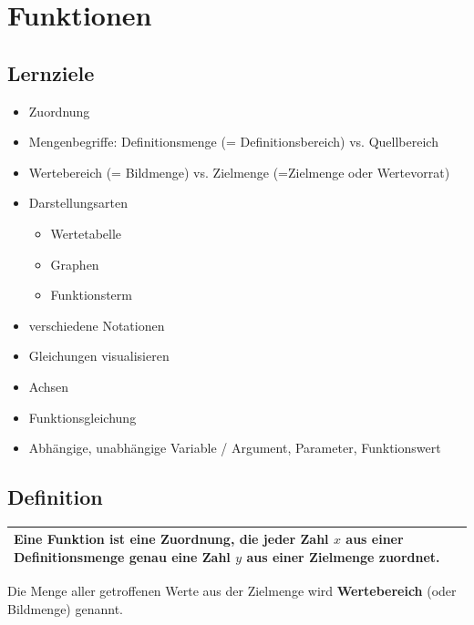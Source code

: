
\section{Funktionen}
\subsection*{Lernziele}

\begin{itemize}
 \item Zuordnung
 \item Mengenbegriffe: Definitionsmenge (= Definitionsbereich) vs. Quellbereich
 \item Wertebereich (= Bildmenge) vs. Zielmenge
   (=Zielmenge oder Wertevorrat)
 \item Darstellungsarten
   \begin{itemize}
      \item Wertetabelle
      \item Graphen
      \item Funktionsterm
   \end{itemize}
 \item verschiedene Notationen
 \item Gleichungen visualisieren
 \item Achsen
 \item Funktionsgleichung
 \item Abhängige, unabhängige Variable / Argument, Parameter, Funktionswert
\end{itemize}


\newpage
\subsection{Definition}
\begin{center}
  \begin{tabular}{|p{14cm}|}
    \hline
    Eine \textbf{Funktion}\index{Funktion} ist eine \textbf{Zuordnung}\index{Zuordnung}, die jeder Zahl
    $x$ aus einer Definitionsmenge \textbf{genau} eine Zahl $y$ aus
    einer Zielmenge\index{Zielmenge} zuordnet.\\
    \hline
\end{tabular}
\end{center}
Die Menge aller getroffenen Werte aus der Zielmenge wird \textbf{Wertebereich}
(oder Bildmenge) genannt.

